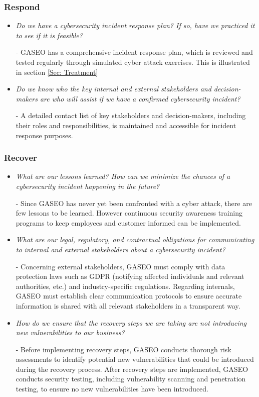 \documentclass[12pt]{article}
\begin{document}
\subsubsection*{Respond}
 \begin{itemize}
     \item \textit{Do we have a cybersecurity incident response plan? If so, have we practiced it to see if it is feasible?}
     
     - GASEO has a comprehensive incident response plan, which is reviewed and tested regularly through simulated cyber attack exercises. This is illustrated in section \ref{Sec: Treatment}
     \item \textit{Do we know who the key internal and external stakeholders and decision-makers are who will assist if we have a confirmed cybersecurity incident?}
     
     - A detailed contact list of key stakeholders and decision-makers, including their roles and responsibilities, is maintained and accessible for incident response purposes.
 \end{itemize}
 
\subsubsection*{Recover}
 \begin{itemize}
     \item \textit{What are our lessons learned? How can we minimize the chances of a cybersecurity incident happening in the future?} 
     
     - Since GASEO has never yet been confronted with a cyber attack, there are few lessons to be learned. However continuous security awareness training programs to keep employees and customer informed can be implemented.
     
     \item \textit{What are our legal, regulatory, and contractual obligations for communicating to internal and external stakeholders about a cybersecurity incident?}
     
     - Concerning external stakeholders, GASEO must comply with data protection laws such as GDPR (notifying affected individuals and relevant authorities, etc.) and industry-specific regulations.
     Regarding internals, GASEO must establish clear communication protocols to ensure accurate information is shared with all relevant stakeholders in a transparent way.
     
     \item \textit{How do we ensure that the recovery steps we are taking are not introducing new
    vulnerabilities to our business?}
    
    - Before implementing recovery steps, GASEO conducts thorough risk assessments to identify potential new vulnerabilities that could be introduced during the recovery process. 
    After recovery steps are implemented, GASEO conducts security testing, including vulnerability scanning and penetration testing, to ensure no new vulnerabilities have been introduced.
 \end{itemize}
 
\end{document}
